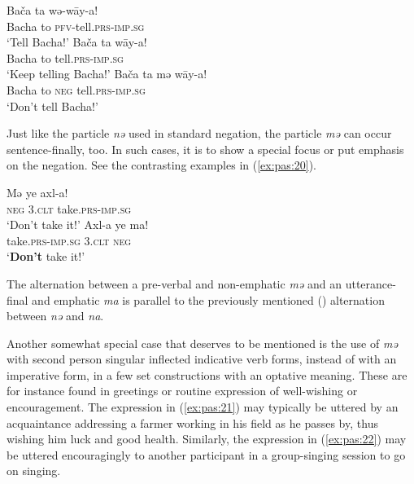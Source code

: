 \documentclass[output=paper,colorlinks,citecolor=brown]{langscibook}
\begin{document}
\ea\label{ex:pas:19}
    \ea\label{ex:pas:19a}
        \gll Bača ta wə-wāy-a!\\
             Bacha to \textsc{pfv}{}-tell.\textsc{prs}{}-\textsc{imp.sg}\\
        \glt‘Tell Bacha!’ 
    \ex\label{ex:pas:19b}
        \gll Bača ta wāy-a!\\
             Bacha to tell.\textsc{prs}{}-\textsc{imp.sg}\\
        \glt ‘Keep telling Bacha!’
    \ex\label{ex:pas:19c}
        \gll Bača ta mə wāy{}-a!\\
             Bacha to \textsc{neg} tell.\textsc{prs}{}-\textsc{imp.sg}\\
        \glt ‘Don’t tell Bacha!’
    \z
\z 

Just like the particle \textit{nə} used in standard negation, the particle \textit{mə} can occur sentence-finally, too. In such cases, it is to show a special focus or put emphasis on the negation. See the contrasting examples in (\ref{ex:pas:20}).

\ea\label{ex:pas:20}
    \ea\label{ex:pas:20a}
        \gll Mə ye axl-a! \\
            \textsc{neg} \textsc{3.clt} take.\textsc{prs{}-imp.sg} \\
        \glt ‘Don’t take it!’
    \ex\label{ex:pas:20b}
        \gll Axl-a ye ma!\\
             take.\textsc{prs{}-imp.sg} \textsc{3.clt} \textsc{neg} \\
        \glt ‘\textbf{Don’t} take it!’
    \z
\z 

The alternation between a pre-verbal and non-emphatic \textit{mə} and an utterance-final and emphatic \textit{ma} is parallel to the previously mentioned () alternation between \textit{nə} and \textit{na}. 

Another somewhat special case that deserves to be mentioned is the use of \textit{mə} with second person singular inflected indicative verb forms, instead of with an imperative form, in a few set constructions with an optative meaning. These are for instance found in greetings or routine expression of well-wishing or encouragement. The expression in (\ref{ex:pas:21}) may typically be uttered by an acquaintance addressing a farmer working in his field as he passes by, thus wishing him luck and good health. Similarly, the expression in (\ref{ex:pas:22}) may be uttered encouragingly to another participant in a group-singing session to go on singing. 
\end{document}
